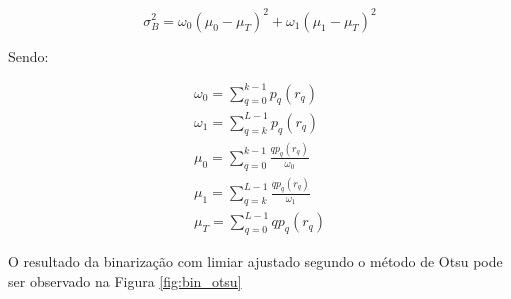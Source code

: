 \begin{equation}\label{eq:maximizacao_variancia}
  \sigma_{B}^2 = \omega_0(\mu_0 - \mu_T)^2 + \omega_1(\mu_1 - \mu_T)^2
\end{equation}

Sendo:

\begin{subequations}\label{eq:somatorios_maximizacao}
\begin{align}
  \omega_0 = \sum_{q=0}^{k-1} p_q(r_q)\\
  \omega_1 = \sum_{q=k}^{L-1} p_q(r_q)\\
     \mu_0 = \sum_{q=0}^{k-1} \frac{qp_q(r_q)}{\omega_0}\\
     \mu_1 = \sum_{q=k}^{L-1} \frac{qp_q(r_q)}{\omega_1}\\
     \mu_T = \sum_{q=0}^{L-1} qp_q(r_q)
\end{align}
\end{subequations}

O resultado da binarização com limiar ajustado segundo o método de Otsu pode
ser observado na Figura \ref{fig:bin_otsu}

